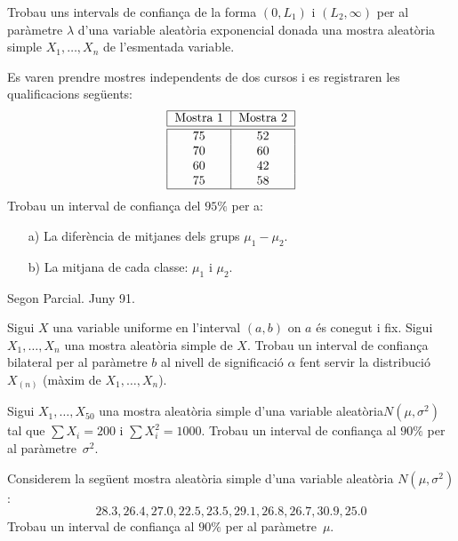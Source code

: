 \newpage

\begin{prob}
Trobau uns intervals de confian\c{c}a de la forma $(0,L_1)$ i
$(L_2,\infty)$ per al par\`ametre $\lambda$ d'una variable aleat\`oria
exponencial donada una mostra aleat\`oria simple $X_1,\ldots,X_n$ de
l'esmentada variable.
\end{prob}

\begin{prob}
Es varen prendre mostres independents de dos cursos i es registraren
les qualificacions seg\"uents:
$$
\begin{tabular}{|c|c|}
\hline
Mostra
1&Mostra 2\\\hline\hline
75&52\\ 70&60\\ 60&42\\
75&58\\\hline
\end{tabular}
$$
Trobau un interval de confian\c{c}a del $95\%$ per a:
\begin{itemize}
\item[a)]{La difer\`encia de mitjanes dels grups $\mu_1 -\mu_2$.}
\item[b)]{La mitjana de cada classe: $\mu_1$ i $\mu_2$.}
\end{itemize}
{\footnotesize Segon
Parcial. Juny 91.}
\end{prob}

\begin{prob}
{
Sigui $X$ una variable uniforme en l'interval $(a,b)$ on $a$ \'es
conegut i fix. Sigui $X_1,\ldots,X_n$ una mostra aleat\`oria simple de $X$.
Trobau un interval de confian\c{c}a bilateral per al par\`ametre $b$ 
al nivell de
significaci\'o $\alpha$ fent servir la distribuci\'o $X_{(n)}$ (m\`axim
de $X_1,\ldots,X_n$).
}
\end{prob}

\begin{prob}
{
Sigui $X_1,\ldots,X_{50}$ una mostra aleat\`oria simple d'una variable
aleat\`oria\break $N(\mu,\sigma^2)$ tal que $\sum X_i =200$ i $\sum X_i^2 =1000$. 
Trobau un interval de confian\c{c}a al $90\%$ per al par\`ametre~$\sigma^2$.
}
\end{prob}

\begin{prob}
{
Considerem la seg\"uent mostra aleat\`oria simple d'una variable
aleat\`oria $N(\mu,\sigma^2)$:
\[
28.3,26.4,27.0,22.5,23.5,29.1,26.8,26.7,30.9,25.0
\]
Trobau un interval de confian\c{c}a al $90\%$ per al par\`ametre~$\mu$.
}
\end{prob}

